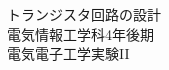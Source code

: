 \documentclass[10pt,a4j,dvipdfmx]{jarticle}
\begin{document}
\setlength{\abovedisplayskip}{1.5pt} 
\setlength{\belowdisplayskip}{0pt}
\thispagestyle{empty}
\begin{spacing}{1}
\begin{center}
\vspace*{3.5cm}
{\Huge トランジスタ回路の設計}\\
\vspace*{12.5cm}
{\Large 電気情報工学科4年後期}\\
{\Large 電気電子工学実験II}\\
\vspace*{1cm}

\end{center}

\newpage
{}
\tableofcontents
\end{spacing}
\clearpage
{}
\pagestyle{fancy}
\setlength{\headheight}{5truemm}

%





\end{document}
